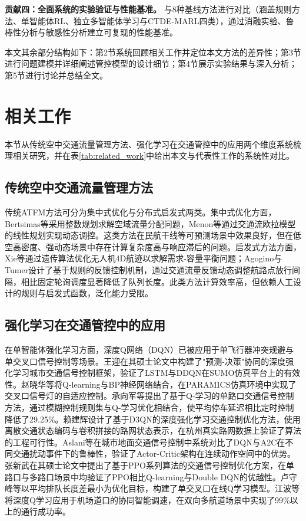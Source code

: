 \documentclass[12pt,a4paper,UTF8]{ctexart}
\begin{document}
\textbf{贡献四：全面系统的实验验证与性能基准。} 与8种基线方法进行对比（涵盖规则方法、单智能体RL、独立多智能体学习与CTDE-MARL四类），通过消融实验、鲁棒性分析与敏感性分析建立可复现的性能基准。

本文其余部分结构如下：第2节系统回顾相关工作并定位本文方法的差异性；第3节进行问题建模并详细阐述管控模型的设计细节；第4节展示实验结果与深入分析；第5节进行讨论并总结全文。

\section{相关工作}

本节从传统空中交通流量管理方法、强化学习在交通管控中的应用两个维度系统梳理相关研究，并在表\ref{tab:related_work}中给出本文与代表性工作的系统性对比。

\subsection{传统空中交通流量管理方法}

传统ATFM方法可分为集中式优化与分布式启发式两类。集中式优化方面，Bertsimas等采用整数规划求解空域流量分配问题，Menon等通过交通流欧拉模型的线性规划实现动态调控\cite{ref6}。这类方法在民航干线等可预测场景中效果良好，但在低空高密度、强动态场景中存在计算复杂度高与响应滞后的问题。启发式方法方面，Xie等通过遗传算法优化无人机4D航迹以求解需求-容量平衡问题\cite{ref6}；Agogino与Tumer设计了基于规则的反馈控制机制，通过交通流量反馈动态调整航路点放行间隔，相比固定轮询调度显著降低了队列长度\cite{ref4}。此类方法计算效率高，但依赖人工设计的规则与启发式函数，泛化能力受限。

\subsection{强化学习在交通管控中的应用}

在单智能体强化学习方面，深度Q网络（DQN）已被应用于单飞行器冲突规避与单交叉口信号控制等场景。王迎在其硕士论文中构建了"预测-决策"协同的深度强化学习城市交通信号控制框架，验证了LSTM与DDQN在SUMO仿真平台上的有效性\cite{ref13}。赵晓华等将Q-learning与BP神经网络结合，在PARAMICS仿真环境中实现了交叉口信号灯的自适应控制\cite{ref14}。承向军等提出了基于Q-学习的单路口交通信号控制方法，通过模糊控制规则集与Q-学习优化相结合，使平均停车延迟相比定时控制降低了29.25\%\cite{ref15}。赖建辉设计了基于D3QN的深度强化学习交通控制优化方法，使用离散交通状态编码与卷积拼接的路网状态表示，在杭州真实路网数据上验证了算法的工程可行性\cite{ref16}。Aslani等在城市地面交通信号控制中系统对比了DQN与A2C在不同交通扰动事件下的鲁棒性，验证了Actor-Critic架构在连续动作空间中的优势\cite{ref10}。张新武在其硕士论文中提出了基于PPO系列算法的交通信号控制优化方案\cite{ref17}，在单路口与多路口场景中均验证了PPO相比Q-learning与Double DQN的优越性。卢守峰等以平均排队长度差最小为优化目标，构建了单交叉口在线Q学习模型\cite{ref18}。江波等将深度Q学习应用于机场道口的协同智能调速，在双向多航道场景中实现了99\%以上的通行成功率\cite{ref19}。
\end{document}
